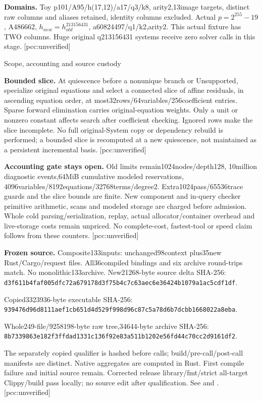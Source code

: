 \documentclass[10pt]{article}
\begin{document}
\textbf{Domains.} Toy p101/A95/h(17,12)/a17/q3/k8, arity2,13image targets,
distinct raw columns and aliases retained, identity columns excluded. Actual
$p=2^{255}-19$, A486662, $h_{new}=h_{old}^{213156431}$, a60824497/q1/k2,arity2.
This actual fixture has TWO columns. Huge original q213156431 systems receive
zero solver calls in this stage. [pcc:unverified]

\newpage
\begin{center}\Large Scope, accounting and source custody\end{center}
\textbf{Bounded slice.} At quiescence before a nonunique branch or Unsupported,
specialize original equations and select a connected slice of affine
residuals, in ascending equation order, at most32rows/64variables/256coefficient
entries. Sparse forward elimination carries original-equation weights.
Only a unit or nonzero constant affects search after coefficient checking.
Ignored rows make the slice incomplete. No full original-System copy or
dependency rebuild is performed; a bounded slice is recomputed at a new
quiescence, not maintained as a persistent incremental basis. [pcc:unverified]

\textbf{Accounting gate stays open.} Old limits remain1024nodes/depth128,
10million diagnostic events,64MiB cumulative modeled reservations,
4096variables/8192equations/32768terms/degree2. Extra1024pass/65536trace guards
and the slice bounds are finite. New component and in-query checker primitive
arithmetic, scans and modeled storage are charged before admission. Whole
cold parsing/serialization, replay, actual allocator/container overhead and
live-storage costs remain unpriced. No complete-cost, fastest-tool or speed
claim follows from these counters. [pcc:unverified]

\textbf{Frozen source.} Composite133inputs: unchanged98context plus35new
Rust/Cargo/request files. All36compiled bindings and six archive round-trips
match. No monolithic133archive. New21268-byte source delta SHA-256:\\
\texttt{d3f611b4faf005dfc72a679178d3f75b4c7c63aec6e36424b1079a1ac5cdf1df}.\par
Copied3323936-byte executable SHA-256:\\
\texttt{939476d96d8111aef1cb651d4d529f998d96c87c5a78d6b7dcbb1668022a8eba}.\par
Whole249-file/9258198-byte raw tree,34644-byte archive SHA-256:\\
\texttt{8b7339863e182f3ffdad1331c136f92e83a511b1202e56fd44c70cc2d9161df2}.\par
The separately copied qualifier is hashed before calls; build/pre-call/post-call
manifests are distinct. Native aggregates are computed in Rust. First compile
failure and initial source remain. Corrected release library/fmt/strict
all-target Clippy/build pass locally; no source edit after qualification.
See  and . [pcc:unverified]
\end{document}
